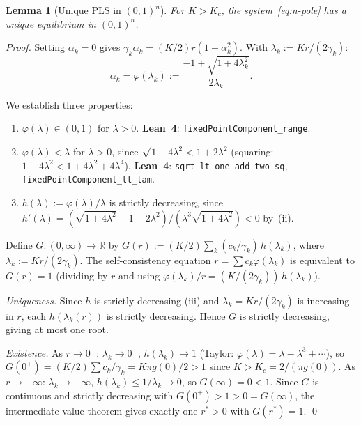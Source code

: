 \documentclass[11pt,a4paper]{article}
\newtheorem{lemma}[theorem]{Lemma}
\theoremstyle{definition}
\newcommand{\R}{\mathbb{R}}
\begin{document}
\begin{lemma}[Unique PLS in $(0,1)^n$]\label{lem:unique}
For $K > K_c$, the system~\eqref{eq:n-pole} has a unique equilibrium in $(0,1)^n$.
\end{lemma}

\begin{proof}
Setting $\dot{\alpha}_k = 0$ gives $\gamma_k\alpha_k = (K/2)r(1 - \alpha_k^2)$. With $\lambda_k := Kr/(2\gamma_k)$:
\[
\alpha_k = \varphi(\lambda_k) := \frac{-1 + \sqrt{1 + 4\lambda_k^2}}{2\lambda_k}.
\]

We establish three properties:
\begin{enumerate}[label=(\roman*)]
\item $\varphi(\lambda) \in (0,1)$ for $\lambda > 0$. \textbf{Lean~4}: \texttt{fixedPointComponent\_range}.
\item $\varphi(\lambda) < \lambda$ for $\lambda > 0$, since $\sqrt{1+4\lambda^2} < 1 + 2\lambda^2$ (squaring: $1+4\lambda^2 < 1 + 4\lambda^2 + 4\lambda^4$). \textbf{Lean~4}: \texttt{sqrt\_lt\_one\_add\_two\_sq}, \texttt{fixedPointComponent\_lt\_lam}.
\item $h(\lambda) := \varphi(\lambda)/\lambda$ is strictly decreasing, since $h'(\lambda) = (\sqrt{1+4\lambda^2} - 1 - 2\lambda^2)/(\lambda^3\sqrt{1+4\lambda^2}) < 0$ by~(ii).
\end{enumerate}

Define $G : (0,\infty) \to \R$ by $G(r) := (K/2)\sum_k (c_k/\gamma_k)\,h(\lambda_k)$, where $\lambda_k := Kr/(2\gamma_k)$. The self-consistency equation $r = \sum c_k\varphi(\lambda_k)$ is equivalent to $G(r) = 1$ (dividing by $r$ and using $\varphi(\lambda_k)/r = (K/(2\gamma_k))\,h(\lambda_k)$).

\emph{Uniqueness.} Since $h$ is strictly decreasing (iii) and $\lambda_k = Kr/(2\gamma_k)$ is increasing in $r$, each $h(\lambda_k(r))$ is strictly decreasing. Hence $G$ is strictly decreasing, giving at most one root.

\emph{Existence.} As $r \to 0^+$: $\lambda_k \to 0^+$, $h(\lambda_k) \to 1$ (Taylor: $\varphi(\lambda) = \lambda - \lambda^3 + \cdots$), so $G(0^+) = (K/2)\sum c_k/\gamma_k = K\pi g(0)/2 > 1$ since $K > K_c = 2/(\pi g(0))$. As $r \to +\infty$: $\lambda_k \to +\infty$, $h(\lambda_k) \leq 1/\lambda_k \to 0$, so $G(\infty) = 0 < 1$. Since $G$ is continuous and strictly decreasing with $G(0^+) > 1 > 0 = G(\infty)$, the intermediate value theorem gives exactly one $r^* > 0$ with $G(r^*) = 1$. \qed
\end{proof}
\end{document}
